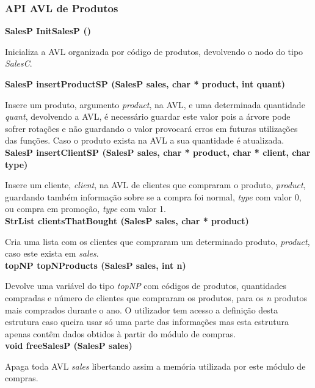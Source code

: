 \documentclass[10pt] {article}
\begin{document}
 \subsubsection{API AVL de Produtos}
\noindent \textbf {SalesP InitSalesP ()}
\par Inicializa a AVL organizada por código de produtos, devolvendo o nodo do tipo \emph{SalesC}.

\newpage
\noindent \textbf {SalesP insertProductSP (SalesP sales, char * product, int quant)}
\par Insere um produto, argumento \emph{product}, na AVL, e uma determinada quantidade \emph{quant}, 
devolvendo a AVL, é necessário guardar este valor pois a árvore pode sofrer rotações e não guardando o valor 
provocará erros em futuras utilizações das funções. Caso o produto exista na AVL a sua quantidade é atualizada.\\

\noindent \textbf {SalesP insertClientSP (SalesP sales, char * product, char * client, char type)}
\par Insere um cliente, \emph{client}, na AVL de clientes que compraram o produto, \emph{product}, guardando 
também informação sobre se a compra foi normal, \emph{type} com valor 0, ou compra em promoção, 
\emph{type} com valor 1.\\

\noindent \textbf {StrList clientsThatBought (SalesP sales, char * product)}
\par Cria uma lista com os clientes que compraram um determinado produto, \emph{product}, caso este exista em
 \emph{sales}.\\
 
\noindent \textbf {topNP topNProducts (SalesP sales, int n)}
\par Devolve uma variável do tipo \emph{topNP} com códigos de produtos, quantidades compradas e número de 
clientes que compraram os produtos, para os \emph{n} produtos mais comprados durante o ano. O utilizador tem 
acesso a definição desta estrutura caso queira usar só uma parte das informações mas esta estrutura apenas 
contêm dados obtidos à partir do módulo de compras. \\

\noindent \textbf {void freeSalesP (SalesP sales)}
\par Apaga toda AVL \emph{sales} libertando assim a memória utilizada por este módulo de compras.\\
\end{document}
